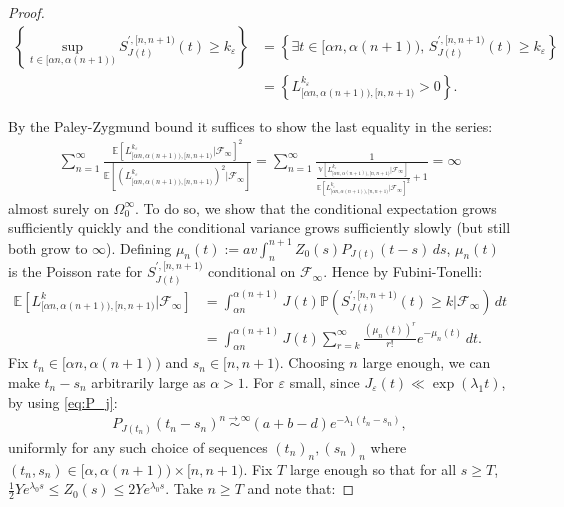 \documentclass{article}
\numberwithin{equation}{section}
\begin{document}
\begin{proof}
  \begin{align*}
    \left\{\sup_{t\in [\alpha n,\alpha(n+1))}S_{J(t)}^{',[n,n+1)}(t)\geq k_\varepsilon\right\}&=\left\{\exists t\in [\alpha n,\alpha(n+1)),\,S_{J(t)}^{',[n,n+1)}(t)\geq k_\varepsilon\right\}\\
    &=\left\{L_{[\alpha n,\alpha (n+1)),[n,n+1)}^{k_\varepsilon}>0\right\}.
  \end{align*}

  By the Paley-Zygmund bound it suffices to show the last equality in the series:
  \begin{align}
    \sum_{n=1}^\infty \frac{\mathbb{E}\left[L_{[\alpha n,\alpha (n+1)),[n,n+1)}^{k_\varepsilon}|\mathcal{F}_\infty\right]^2}{\mathbb{E}\left[\left(L_{[\alpha n,\alpha (n+1)),[n,n+1)}^{k_\varepsilon}\right)^2|\mathcal{F}_\infty\right]}=\sum_{n=1}^\infty \frac{1}{\frac{\mathbb{V}\left[L^{k_\varepsilon}_{[\alpha n,\alpha(n+1)),[n,n+1)}|\mathcal{F}_\infty\right]}{\mathbb{E}\left[L^{k_\varepsilon}_{[\alpha n,\alpha(n+1)),[n,n+1)}|\mathcal{F}_\infty\right]^2}+1}=\infty\label{eq:tight_limsup_to_show}
  \end{align}
  almost surely on $\Omega_0^\infty$. To do so, we show that the conditional expectation grows sufficiently quickly and the conditional variance grows sufficiently slowly (but still both grow to $\infty$). Defining $\mu_n(t):=av\int_n^{n+1}Z_0(s)P_{J(t)}(t-s)\,ds$, $\mu_n(t)$ is the Poisson rate for $S_{J(t)}^{',[n,n+1)}$ conditional on $\mathcal{F}_\infty$. Hence by Fubini-Tonelli:
  \begin{align}
    \mathbb{E}\left[L_{[\alpha n,\alpha (n+1)),[n,n+1)}^k|\mathcal{F}_\infty\right]&=\int_{\alpha n}^{\alpha(n+1)}J(t)\mathbb{P}\left(S_{J(t)}^{',[n,n+1)}(t)\geq k|\mathcal{F}_\infty\right)\,dt\nonumber\\
    &=\int_{\alpha n}^{\alpha(n+1)}J(t)\sum_{r=k}^\infty\frac{(\mu_n(t))^r}{r!}e^{-\mu_n(t)}\,dt.\label{eq:L_limsup_larger_1}
\end{align}
Fix $t_n\in [\alpha n,\alpha(n+1))$ and $s_n\in [n,n+1)$. Choosing $n$ large enough, we can make $t_n-s_n$ arbitrarily large as $\alpha>1$. For $\varepsilon$ small, since $J_\varepsilon(t)\ll \exp(\lambda_1 t)$, by using \ref{eq:P_j}:
\begin{align*}
    P_{J(t_n)}(t_n-s_n)\overset{n\to\infty}{\sim} (a+b-d)e^{-\lambda_1 (t_n-s_n)},
\end{align*}
uniformly for any such choice of sequences $(t_n)_n,(s_n)_n$ where $(t_n,s_n)\in [\alpha,\alpha(n+1))\times [n,n+1)$. Fix $T$ large enough so that for all $s\geq T$, $\frac{1}{2}Ye^{\lambda_0 s}\leq Z_0(s)\leq 2Ye^{\lambda_0 s}$. Take $n\geq T$ and note that:

\end{proof}
\end{document}
